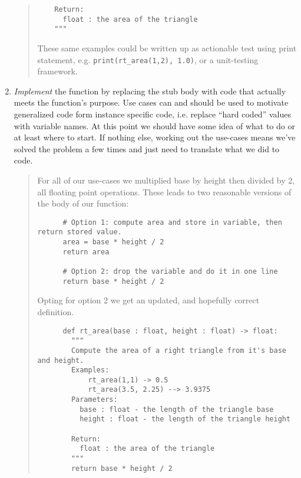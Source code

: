 \documentclass[nobib]{tufte-handout}
\begin{document}
\begin{enumerate}
\begin{quote}
\begin{verbatim}
    Return:
      float : the area of the triangle 
    """
  \end{verbatim}
  These same examples could be written up as actionable test using print statement, e.g. \texttt{print(rt_area(1,2), 1.0)}, or a unit-testing framework. 
  \end{quote}
  \item \textit{Implement} the function by replacing the stub body with code that actually meets the function's purpose. Use cases can and should be used to motivate generalized code form instance specific code, i.e. replace ``hard coded'' values with variable names. At this point we should have some idea of what to do or at least where to start. If nothing else, working out the use-cases means we've solved the problem a few times and just need to translate what we did to code.
  \begin{quote}
    For all of our use-cases we multiplied base by height then divided by 2, all floating point operations. These leads to two reasonable versions of the body of our function:
    \begin{verbatim}
      # Option 1: compute area and store in variable, then return stored value.
      area = base * height / 2 
      return area 

      # Option 2: drop the variable and do it in one line 
      return base * height / 2
    \end{verbatim}
    Opting for option 2 we get an updated, and hopefully correct definition. 
    \begin{verbatim}
      def rt_area(base : float, height : float) -> float:
        """
        Compute the area of a right triangle from it's base and height. 
        Examples:  
            rt_area(1,1) -> 0.5
            rt_area(3.5, 2.25) --> 3.9375
        Parameters:
          base : float - the length of the triangle base 
          height : float - the length of the triangle height
    
        Return:
          float : the area of the triangle 
        """
        return base * height / 2
    \end{verbatim}

  \end{quote}


\end{enumerate}
\end{document}
